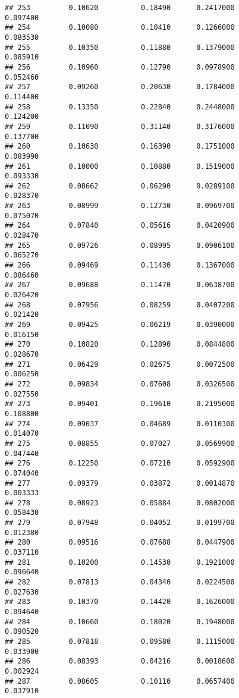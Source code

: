 \documentclass[
]{article}
\begin{document}
\begin{verbatim}
## 253         0.10620          0.18490      0.2417000            0.097400
## 254         0.10080          0.10410      0.1266000            0.083530
## 255         0.10350          0.11880      0.1379000            0.085910
## 256         0.10960          0.12790      0.0978900            0.052460
## 257         0.09260          0.20630      0.1784000            0.114400
## 258         0.13350          0.22840      0.2448000            0.124200
## 259         0.11090          0.31140      0.3176000            0.137700
## 260         0.10630          0.16390      0.1751000            0.083990
## 261         0.10000          0.10880      0.1519000            0.093330
## 262         0.08662          0.06290      0.0289100            0.028370
## 263         0.08999          0.12730      0.0969700            0.075070
## 264         0.07840          0.05616      0.0420900            0.028470
## 265         0.09726          0.08995      0.0906100            0.065270
## 266         0.09469          0.11430      0.1367000            0.086460
## 267         0.09688          0.11470      0.0638700            0.026420
## 268         0.07956          0.08259      0.0407200            0.021420
## 269         0.09425          0.06219      0.0390000            0.016150
## 270         0.10820          0.12890      0.0844800            0.028670
## 271         0.06429          0.02675      0.0072500            0.006250
## 272         0.09834          0.07608      0.0326500            0.027550
## 273         0.09401          0.19610      0.2195000            0.108800
## 274         0.09037          0.04689      0.0110300            0.014070
## 275         0.08855          0.07027      0.0569900            0.047440
## 276         0.12250          0.07210      0.0592900            0.074040
## 277         0.09379          0.03872      0.0014870            0.003333
## 278         0.08923          0.05884      0.0802000            0.058430
## 279         0.07948          0.04052      0.0199700            0.012380
## 280         0.09516          0.07688      0.0447900            0.037110
## 281         0.10200          0.14530      0.1921000            0.096640
## 282         0.07813          0.04340      0.0224500            0.027630
## 283         0.10370          0.14420      0.1626000            0.094640
## 284         0.10660          0.18020      0.1948000            0.090520
## 285         0.07818          0.09580      0.1115000            0.033900
## 286         0.08393          0.04216      0.0018600            0.002924
## 287         0.08605          0.10110      0.0657400            0.037910

\end{verbatim}
\end{document}
